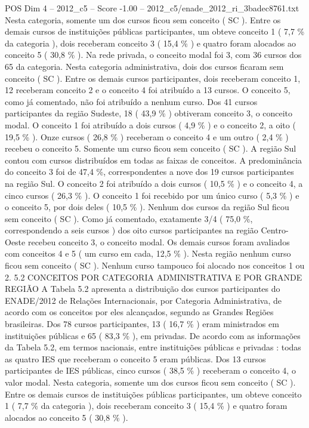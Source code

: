\begin{textsample}{POS Dim 4 – 2012\_c5 – Score -1.00 – 2012\_c5/enade\_2012\_ri\_3badec8761.txt}
Nesta categoria, somente um dos cursos ficou sem conceito ( SC ).
Entre os demais cursos de instituições públicas participantes, um obteve conceito 1 ( 7,7 \% da categoria ), dois receberam conceito 3 ( 15,4 \% ) e quatro foram alocados ao conceito 5 ( 30,8 \% ).
Na rede privada, o conceito modal foi 3, com 36 cursos dos 65 da categoria.
Nesta categoria administrativa, dois dos cursos ficaram sem conceito ( SC ).
Entre os demais cursos participantes, dois receberam conceito 1, 12 receberam conceito 2 e o conceito 4 foi atribuído a 13 cursos.
O conceito 5, como já comentado, não foi atribuído a nenhum curso.
Dos 41 cursos participantes da região Sudeste, 18 ( 43,9 \% ) obtiveram conceito 3, o conceito modal.
O conceito 1 foi atribuído a dois cursos ( 4,9 \% ) e o conceito 2, a oito ( 19,5 \% ).
Onze cursos ( 26,8 \% ) receberam o conceito 4 e um outro ( 2,4 \% ) recebeu o conceito 5.
Somente um curso ficou sem conceito ( SC ).
A região Sul contou com cursos distribuídos em todas as faixas de conceitos.
A predominância do conceito 3 foi de 47,4 \%, correspondentes a nove dos 19 cursos participantes na região Sul.
O conceito 2 foi atribuído a dois cursos ( 10,5 \% ) e o conceito 4, a cinco cursos ( 26,3 \% ).
O conceito 1 foi recebido por um único curso ( 5,3 \% ) e o conceito 5, por dois deles ( 10,5 \% ).
Nenhum dos cursos da região Sul ficou sem conceito ( SC ).
Como já comentado, exatamente 3/4 ( 75,0 \%, correspondendo a seis cursos ) dos oito cursos participantes na região Centro-Oeste recebeu conceito 3, o conceito modal.
Os demais cursos foram avaliados com conceitos 4 e 5 ( um curso em cada, 12,5 \% ).
Nesta região nenhum curso ficou sem conceito ( SC ).
Nenhum curso tampouco foi alocado nos conceitos 1 ou 2. 5.2 CONCEITOS POR CATEGORIA ADMINISTRATIVA E POR GRANDE REGIÃO A Tabela 5.2 apresenta a distribuição dos cursos participantes do ENADE/2012 de Relações Internacionais, por Categoria Administrativa, de acordo com os conceitos por eles alcançados, segundo as Grandes Regiões brasileiras.
Dos 78 cursos participantes, 13 ( 16,7 \% ) eram ministrados em instituições públicas e 65 ( 83,3 \% ), em privadas.
De acordo com as informações da Tabela 5.2, em termos nacionais, entre instituições públicas e privadas : todas as quatro IES que receberam o conceito 5 eram públicas.
Dos 13 cursos participantes de IES públicas, cinco cursos ( 38,5 \% ) receberam o conceito 4, o valor modal.
Nesta categoria, somente um dos cursos ficou sem conceito ( SC ).
Entre os demais cursos de instituições públicas participantes, um obteve conceito 1 ( 7,7 \% da categoria ), dois receberam conceito 3 ( 15,4 \% ) e quatro foram alocados ao conceito 5 ( 30,8 \% ).

\end{textsample}

